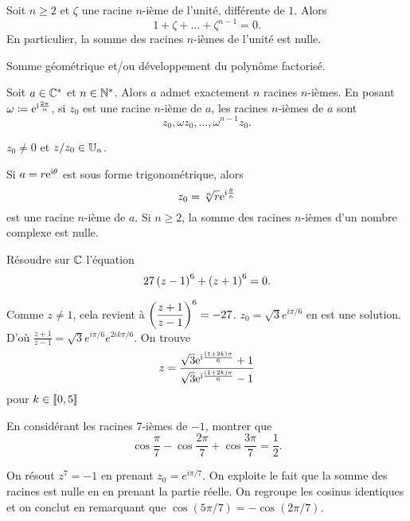 \documentclass{magnolia}
\begin{document}
\begin{proposition}[utile=-3]
Soit $n\geq 2$ et $\zeta$ une racine $n$-ième de l'unité, différente de $1$.
Alors
\[1+\zeta+\dots+\zeta^{n-1}=0.\]
En particulier, la somme des racines $n$-ièmes de l'unité est nulle.
\end{proposition}

\begin{preuve}
Somme géométrique et/ou développement du polynôme factorisé.
\end{preuve}


\begin{proposition}[utile=-3]
Soit $a\in\mathbb{C}^*$ et $n\in{\mathbb{N}^*}$. Alors $a$ admet exactement $n$ racines $n$-ièmes. En posant $\omega\coloneqq{\rm e}^{{\rm i}\frac{2\pi}{n}}$, si $z_0$ est une racine $n$-ième de $a$, les racines $n$-ièmes de $a$ sont
\[z_0,\omega z_0,\ldots,\omega^{n-1}z_0.\]
\end{proposition}

\begin{preuve}
$z_0\neq 0$ et $z/z_0 \in \U[n]$.

\end{preuve}

\begin{remarques}
\remarque Si $a=r{\rm e}^{{\rm i}\theta}$ est sous forme trigonométrique, alors 
  \[z_0=\sqrt[n]{r}{\rm e}^{{\rm i}\frac{\theta}{n}}\]
  est une racine $n$-ième de $a$.
\remarque Si $n\geq 2$, la somme des racines $n$-ièmes d'un nombre complexe est
  nulle.
\end{remarques}

\begin{exos}
\exo Résoudre sur $\mathbb{C}$ l'équation
  \[27\left(z-1\right)^6+\left(z+1\right)^6=0.\]
  \begin{sol}
  Comme $z\neq 1$, cela revient à $\displaystyle \left(\frac{z+1}{z-1}\right)^6=-27$. $z_0=\sqrt{3}e^{i\pi/6}$ en est une solution. D'où $\frac{z+1}{z-1}=\sqrt{3}e^{i\pi/6}e^{2ik\pi/6}$.
  On trouve
  \[z=\frac{\sqrt{3}{\rm e}^{{\rm i}\frac{(1+2k)\pi}{6}}+1}{\sqrt{3}{\rm e}^{{\rm i}\frac{(1+2k)\pi}{6}}-1}\]
   pour $k\in\left\llbracket 0,5\right\rrbracket$
  \end{sol}
\exo En considérant les racines 7-ièmes de $-1$, montrer que
  \[\cos\frac{\pi}{7}-\cos\frac{2\pi}{7}+\cos\frac{3\pi}{7}=\frac{1}{2}.\]
  \begin{sol}
  On résout $z^7=-1$ en prenant $z_0=e^{i\pi/7}$. On exploite le fait que la somme des racines est nulle en en prenant la partie réelle. On regroupe les cosinus identiques et on conclut en remarquant que $\cos(5\pi/7)=-\cos(2\pi/7)$.
  \end{sol}
\end{exos}
\end{document}
